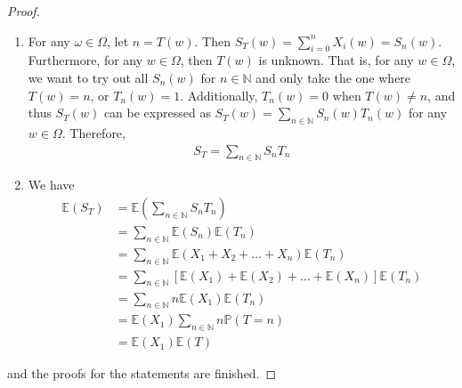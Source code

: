 \begin{proof}
\begin{enumerate}[label=(\roman*)]
\begin{align*}
      \end{align*}
      The same thing can be shown for $T_{n}=0$ in the similar way. Therefore, the equation $(4.1)$ is satisfied, and thus $T_{n}$ and $S_{n}$ are independent. 
    \item For any $\omega \in \Omega$, let $n = T(w)$. Then $S_{T}(w) = \sum_{i=0}^{n}X_{i}(w) = S_{n}(w)$. Furthermore, for any $w \in \Omega$, then $T(w)$ is unknown. That is, for any $w \in \Omega$, we want to try out all $S_{n}(w)$ for $n \in \mathbb{N}$ and only take the one where $T(w)=n$, or $T_{n}(w)=1$. Additionally, $T_{n}(w)=0$ when $T(w) \neq n$, and thus $S_{T}(w)$ can be expressed as $S_{T}(w) = \sum_{n \in \mathbb{N}} S_{n}(w) T_{n}(w)$ for any $w \in \Omega$. Therefore,
      \begin{align*}
        S_{T} = \sum_{n \in \mathbb{N}} S_{n} T_{n}
      \end{align*}
    \item  We have
      \begin{align*}
        \mathbb{E}(S_{T}) &= \mathbb{E}(\sum_{n \in \mathbb{N}} S_{n} T_{n}) \\
                          &= \sum_{n \in \mathbb{N}} \mathbb{E}(S_{n}) \mathbb{E}(T_{n}) \\
                          &= \sum_{n \in \mathbb{N}} \mathbb{E}(X_{1} + X_{2} + \ldots + X_{n}) \mathbb{E}(T_{n}) \\
                          &= \sum_{n \in \mathbb{N}} [\mathbb{E}(X_{1}) + \mathbb{E}(X_{2}) + \ldots + \mathbb{E}(X_{n})] \mathbb{E}(T_{n}) \\
                          &= \sum_{n \in \mathbb{N}} n \mathbb{E}(X_{1}) \mathbb{E}(T_{n}) \\
                          &= \mathbb{E}(X_{1}) \sum_{n \in \mathbb{N}} n \mathbb{P}(T=n) \\
                          &= \mathbb{E}(X_{1}) \mathbb{E}(T)
      \end{align*}
  \end{enumerate}
  and the proofs for the statements are finished.
\end{proof}
